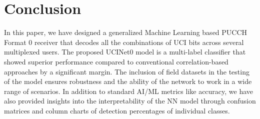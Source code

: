 \documentclass[journal]{IEEEtran}
\begin{document}


\section*{Conclusion}

In this paper, we have designed a generalized Machine Learning based PUCCH Format 0 receiver that decodes all the combinations of UCI bits across several multiplexed users. The proposed UCINet0 model is a multi-label classifier that showed superior performance compared to conventional correlation-based approaches by a significant margin. The inclusion of field datasets in the testing of the model ensures robustness and the ability of the network to work in a wide range of scenarios. In addition to standard AI/ML metrics like accuracy, we have also provided insights into the interpretability of the NN model through confusion matrices and column charts of detection percentages of individual classes.
\end{document}
